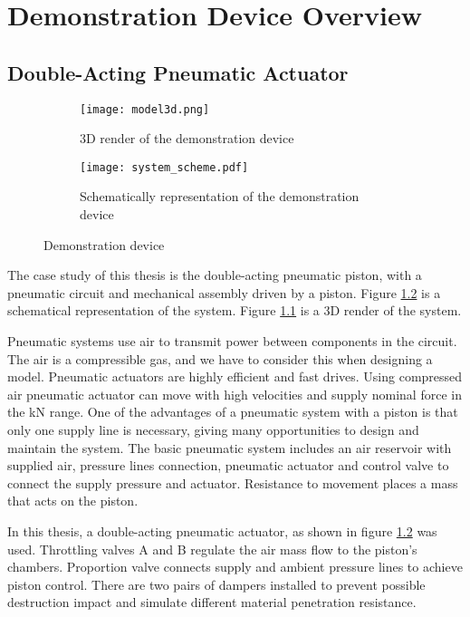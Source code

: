\chapter{Demonstration Device Overview}\label{ch:overview}

\section{Double-Acting Pneumatic Actuator}
\begin{figure}[h!]
    \centering
    \begin{subfigure}[b]{0.3\textwidth}
        \centering
        \texttt{[image: model3d.png]}
        \caption{3D render of the demonstration device}
        \label{fig:3d}
    \end{subfigure} 
    \hfill
    \begin{subfigure}[b]{0.6\textwidth}
        \centering
        \texttt{[image: system\_scheme.pdf]}
        \caption{Schematically representation of the demonstration device}
        \label{fig:device_scheme}
    \end{subfigure}
    \caption{Demonstration device}
    \label{fig:device}
\end{figure}

The case study of this thesis is the double-acting pneumatic piston, with a
pneumatic circuit and mechanical assembly driven by a piston.  Figure
\ref{fig:device_scheme} is a schematical representation of the system.
Figure \ref{fig:3d} is a 3D render of the system.

Pneumatic systems use air to transmit power between components in the
circuit. The air is a compressible gas, and we have to consider this when
designing a model. Pneumatic actuators are highly efficient and fast
drives. Using compressed air pneumatic actuator can move with high
velocities and supply nominal force in the kN range. One of the advantages
of a pneumatic system with a piston is that only one supply line is
necessary, giving many opportunities to design and maintain the system.
The basic pneumatic system includes an air reservoir with supplied air,
pressure lines connection, pneumatic actuator and control valve to connect
the supply pressure and actuator. Resistance to movement places a mass that
acts on the piston. 

In this thesis, a double-acting pneumatic actuator, as shown in figure
\ref{fig:device_scheme} was used. Throttling valves A and B regulate the air mass flow to
the piston's chambers. Proportion valve connects supply and ambient
pressure lines to achieve piston control. There are two pairs of dampers
installed to prevent possible destruction impact and simulate different
material penetration resistance.

